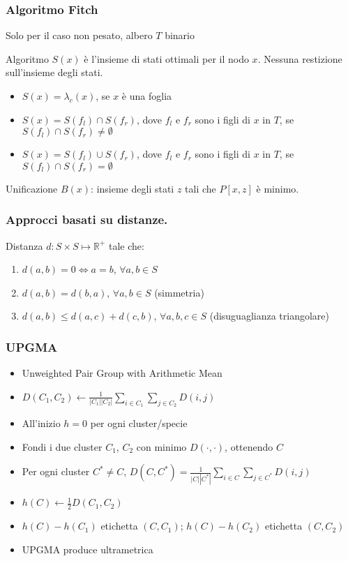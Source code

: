 \begin{frame}[fragile]
\frametitle{Algoritmo Fitch}
Solo per il caso non pesato, albero $T$ binario
\begin{block}{Algoritmo}
$S(x)$ è l'insieme di stati ottimali per il nodo $x$. Nessuna restizione sull'insieme degli stati.


\begin{itemize}
\item
$S(x)=\lambda_{c}(x)$, se $x$ è una foglia
\item
$S(x)= S(f_{l}) \cap S(f_{r})$, dove $f_{l}$ e $f_{r}$ sono i figli di $x$ in $T$,
se $S(f_{l}) \cap S(f_{r})\neq \emptyset$
\item
$S(x)= S(f_{l}) \cup S(f_{r})$, dove $f_{l}$ e $f_{r}$ sono i figli di $x$ in $T$,
se $S(f_{l}) \cap S(f_{r}) = \emptyset$
\end{itemize}
\end{block}
\begin{block}{Unificazione}
$B(x)$: insieme degli stati $z$ tali che $P[x,z]$ è minimo.
\end{block}
\end{frame}

\begin{frame}[fragile]
\frametitle{Approcci basati su distanze.}
\begin{block}{Distanza}
$d: S \times S \mapsto \mathbb{R}^{+}$ tale che:
\begin{enumerate}
\item
$d(a,b) = 0 \Leftrightarrow a=b$, $\forall a,b\in S$
\item
$d(a,b) = d(b,a)$, $\forall a,b\in S$ (simmetria)
\item
$d(a,b) \le d(a,c) + d(c,b)$, $\forall a,b,c\in S$ (disuguaglianza triangolare)
\end{enumerate}
\end{block}
\end{frame}


\begin{frame}[fragile]
  \frametitle{UPGMA}
\begin{itemize}
\item
  Unweighted Pair Group with Arithmetic Mean
\item
  $D(C_{1}, C_{2}) \gets \frac{1}{|C_{1}||C_{2}|}\sum_{i\in C_{1}}\sum_{j\in C_{2}} D(i,j)$
\item
  All'inizio $h=0$ per ogni cluster/specie
\item
Fondi i due cluster $C_{1}$, $C_{2}$ con minimo $D(\cdot, \cdot)$, ottenendo $C$
\item
  Per ogni cluster $C^{*}\neq C$, $D(C, C^{*}) = \frac{1}{|C||C^{*}|}\sum_{i\in C}\sum_{j\in C^{*}} D(i,j)$
\item
  $h(C)\gets \frac{1}{2}D(C_{1}, C_{2})$
\item
  $h(C) - h(C_{1})$ etichetta $(C, C_{1})$; $h(C) - h(C_{2})$ etichetta $(C, C_{2})$
\item
  UPGMA produce ultrametrica
\end{itemize}
\end{frame}



